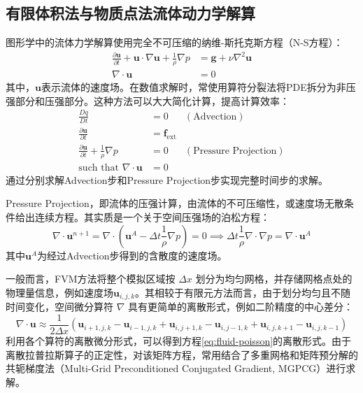 \subsection{有限体积法与物质点法流体动力学解算}\label{sec:fvm-mpm-fluid}

图形学中的流体力学解算使用完全不可压缩的纳维-斯托克斯方程（N-S方程）：
\begin{equation}\label{eq:naiver-stokes-origin}
\begin{aligned}
\frac{\partial \mathbf u}{ \partial t} + \mathbf u \cdot \nabla \mathbf u + \frac 1 {\rho} \nabla p
&= \mathbf g + \nu\nabla ^2 \mathbf u\\
\nabla \cdot \mathbf u& = 0
\end{aligned}
\end{equation}
其中，$\mathbf u$表示流体的速度场。在数值求解时，常使用算符分裂法将PDE拆分为非压强部分和压强部分。这种方法可以大大简化计算，提高计算效率：%
\begin{equation}
  \begin{aligned}
    \frac{D q}{D t} & = 0 &(\text{Advection})\\
    \frac{\partial \mathbf u}{\partial t} & = \mathbf{f}_{\mathrm{ext}}\\
    \frac{\partial \mathbf u}{\partial t} + \frac{1}{\rho} \nabla p& = 0 &(\text{Pressure Projection})\\
    \text{such that }\nabla \cdot \mathbf u &= 0
  \end{aligned}
\end{equation}
通过分别求解Advection步和Pressure Projection步实现完整时间步的求解。

Pressure Projection，即流体的压强计算，由流体的不可压缩性，或速度场无散条件给出连续方程。其实质是一个关于空间压强场的泊松方程：
\begin{equation}
  \label{eq:fluid-poisson}
  \nabla \cdot \mathbf u^{n+1} = \nabla \cdot (\mathbf u^{A} - \Delta t \frac{1}{\rho} \nabla p) = 0 \implies \Delta t \frac{1}{\rho} \nabla \cdot \nabla p = \nabla \cdot \mathbf u^{A}
\end{equation}
其中$\mathbf u^{A}$为经过Advection步得到的含散度的速度场。

一般而言，FVM方法将整个模拟区域按 $\Delta x$ 划分为均匀网格，并存储网格点处的物理量信息，例如速度场$\mathbf u_{i,j,k}$。其相较于有限元方法而言，由于划分均匀且不随时间变化，空间微分算符 $\nabla$ 具有更简单的离散形式，例如二阶精度的中心差分：
\begin{equation}
  \nabla\cdot \mathbf u \approx 
  \frac{1}{2\Delta x}\left(\mathbf u_{i+1,j,k}-\mathbf u_{i-1,j,k} +
    \mathbf u_{i,j+1,k}-\mathbf u_{i,j-1,k}+
  \mathbf u_{i,j,k+1}-\mathbf u_{i,j,k-1}\right)
\end{equation}
利用各个算符的离散微分形式，可以得到方程\ref{eq:fluid-poisson}的离散形式。由于离散拉普拉斯算子的正定性，对该矩阵方程，常用结合了多重网格和矩阵预分解的共轭梯度法（Multi-Grid Preconditioned Conjugated Gradient, MGPCG）进行求解。

